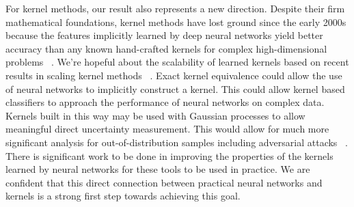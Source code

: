 For kernel methods, our result also represents a new direction. Despite their firm mathematical foundations, kernel methods have lost ground since the early 2000s because the features implicitly learned by deep neural networks yield better accuracy than any known hand-crafted kernels for complex high-dimensional problems ~\citep{NIPS2005_663772ea}. 
We're hopeful about the scalability of learned kernels based on recent results in scaling kernel methods ~\citep{snelson2005sparse}. 
Exact kernel equivalence could allow the use of neural networks to implicitly construct a kernel. 
This could allow kernel based classifiers to approach the performance of neural networks on complex data. 
Kernels built in this way may be used with Gaussian processes to allow meaningful direct uncertainty measurement. 
This would allow for much more significant analysis for out-of-distribution samples including adversarial attacks ~\citep{szegedy2013intriguing, ilyas2019adversarial}. 
There is significant work to be done in improving the properties of the kernels learned by neural networks for these tools to be used in practice.
We are confident that this direct connection between practical neural networks and kernels is a strong first step towards achieving this goal.



